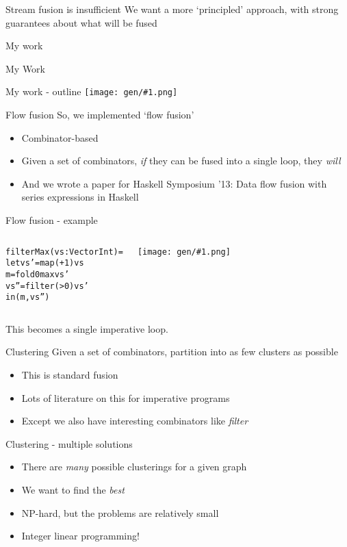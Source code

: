 \documentclass{beamer}
\newcommand{\bl}[1]{\textcolor[rgb]{0.0,0.5,0.9}{#1}}
\newcommand{\g}[1]{\textcolor[rgb]{0.7,0.3,0.3}{#1}}
\newcommand{\fr}[1]{\begin{frame}[fragile]{#1}}
\newcommand{\im}[1]{\texttt{[image: gen/\#1.png]} \\ }
\begin{document}
\fr{Stream fusion is insufficient}
We want a more `principled' approach, with strong guarantees about what will be fused
\end{frame}

\fr{My work}
\begin{center}
\LARGE
My Work
\end{center}
\end{frame}

\fr{My work - outline}
\im{mywork-outline}
\end{frame}


\fr{Flow fusion}
So, we implemented `flow fusion'
\begin{itemize}
\item
Combinator-based
\item
Given a set of combinators, \emph{if} they can be fused into a single loop, they \emph{will}
\item
And we wrote a paper for Haskell Symposium '13: Data flow fusion with series expressions in Haskell
\end{itemize}

\end{frame}

\fr{Flow fusion - example}
\begin{columns}
\column{6cm}
\begin{alltt}
filterMax (\bl{vs} : Vector Int) =
 let \bl{vs'} = \g{map}    (+1)    \bl{vs}
     \bl{m}   = \g{fold}     0 max \bl{vs'}
     \bl{vs''}= \g{filter} (>0)    \bl{vs'}
 in (\bl{m}, \bl{vs''})
\end{alltt}
\column{5cm}
\im{filterMax-unfused}
\end{columns}
This becomes a single imperative loop.
\end{frame}

\fr{Clustering}
Given a set of combinators, partition into as few clusters as possible
\begin{itemize}
\item
This is standard fusion
\item
Lots of literature on this for imperative programs
\item
Except we also have interesting combinators like \emph{filter}
\end{itemize}
\end{frame}


\fr{Clustering - multiple solutions}
\begin{itemize}
\item
There are \emph{many} possible clusterings for a given graph
\item
We want to find the \emph{best}
\item
NP-hard, but the problems are relatively small
\item
Integer linear programming!
\end{itemize}
\end{frame}
\end{document}
